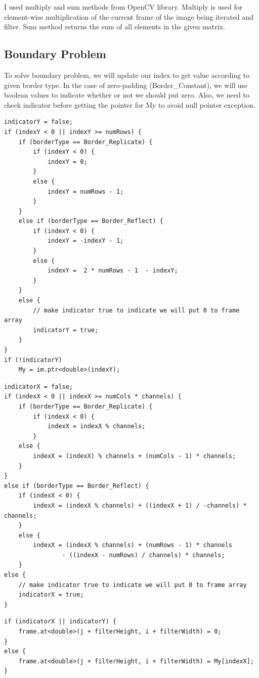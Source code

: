\documentclass{article}
\begin{document}
I used multiply and sum methods from OpenCV library. Multiply is used for element-wise multiplication of the current frame of the image being iterated and filter. Sum method returns the sum of all elements in the given matrix.

\newpage

\subsection{Boundary Problem}

To solve boundary problem, we will update our index to get value according to given border type. In the case of zero-padding (Border\_Constant), we will use boolean values to indicate whether or not we should put zero. Also, we need to check indicator before getting the pointer for My to avoid null pointer exception.

\begin{lstlisting}[caption={Boundary check for indexX (row index).},captionpos=b]
indicatorY = false;
if (indexY < 0 || indexY >= numRows) {
    if (borderType == Border_Replicate) {
        if (indexY < 0) {
            indexY = 0;
        }
        else {
            indexY = numRows - 1;
        }
    }
    else if (borderType == Border_Reflect) {
        if (indexY < 0) {
            indexY = -indexY - 1;
        }
        else {
            indexY =  2 * numRows - 1  - indexY;
        }
    }
    else {
        // make indicator true to indicate we will put 0 to frame array
        indicatorY = true;
    }
}
if (!indicatorY)
    My = im.ptr<double>(indexY);
\end{lstlisting}

\begin{lstlisting}[caption={Boundary check for indexY (column index).},captionpos=b]
indicatorX = false;
if (indexX < 0 || indexX >= numCols * channels) {
	if (borderType == Border_Replicate) {
		if (indexX < 0) {
			indexX = indexX % channels;
		}
	else {
		indexX = (indexX) % channels + (numCols - 1) * channels;
	}
}
else if (borderType == Border_Reflect) {
	if (indexX < 0) {
		indexX = (indexX % channels) + ((indexX + 1) / -channels) * channels;
	}
	else {
		indexX = (indexX % channels) + (numRows - 1) * channels 
				- ((indexX - numRows) / channels) * channels;
	}
else {
	// make indicator true to indicate we will put 0 to frame array
	indicatorX = true;
}
\end{lstlisting}


\begin{lstlisting}[caption={We should also add this check to our code from previous section.},captionpos=b]
if (indicatorX || indicatorY) {
    frame.at<double>(j + filterHeight, i + filterWidth) = 0;
}
else {
    frame.at<double>(j + filterHeight, i + filterWidth) = My[indexX];
}
\end{lstlisting}
\end{document}
